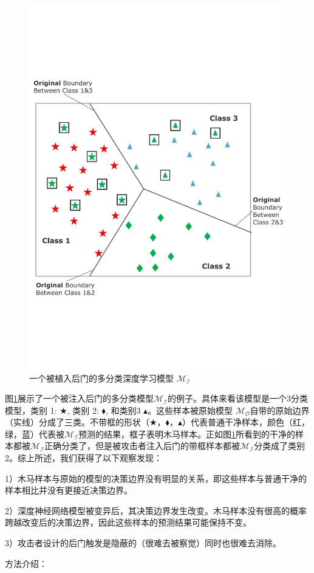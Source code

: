 \documentclass[fontset=macnew,UTF8]{article} %
\begin{document}
\begin{figure}[h]
	\centering
	\includegraphics[width=0.6\linewidth]{Backdoor.pdf}
	\caption{一个被植入后门的多分类深度学习模型 $\mathcal{M}_\mathcal{I}$}
	\label{Backdoor_injected_model}
\end{figure}

图\ref{Backdoor_injected_model}展示了一个被注入后门的多分类模型$\mathcal{M}_\mathcal{I}$的例子。具体来看该模型是一个3分类模型，类别 1: $\bigstar$, 类别 2: $\blacklozenge$, 和类别3 $\blacktriangle$。这些样本被原始模型 $\mathcal{M}_\mathcal{O}$自带的原始边界（实线）分成了三类。不带框的形状（$\bigstar$，$\blacklozenge$，$\blacktriangle$）代表普通干净样本，颜色（红，绿，蓝）代表被$\mathcal{M}_\mathcal{I}$预测的结果，框子表明木马样本。正如图\ref{Backdoor_injected_model}所看到的干净的样本都被$\mathcal{M}_\mathcal{I}$正确分类了，但是被攻击者注入后门的带框样本都被$\mathcal{M}_\mathcal{I}$分类成了类别2。综上所述，我们获得了以下观察发现：

1）木马样本与原始的模型的决策边界没有明显的关系，即这些样本与普通干净的样本相比并没有更接近决策边界。

2）深度神经网络模型被变异后，其决策边界发生改变。木马样本没有很高的概率跨越改变后的决策边界，因此这些样本的预测结果可能保持不变。

3）攻击者设计的后门触发是隐蔽的（很难去被察觉）同时也很难去消除。


方法介绍：
\end{document}
